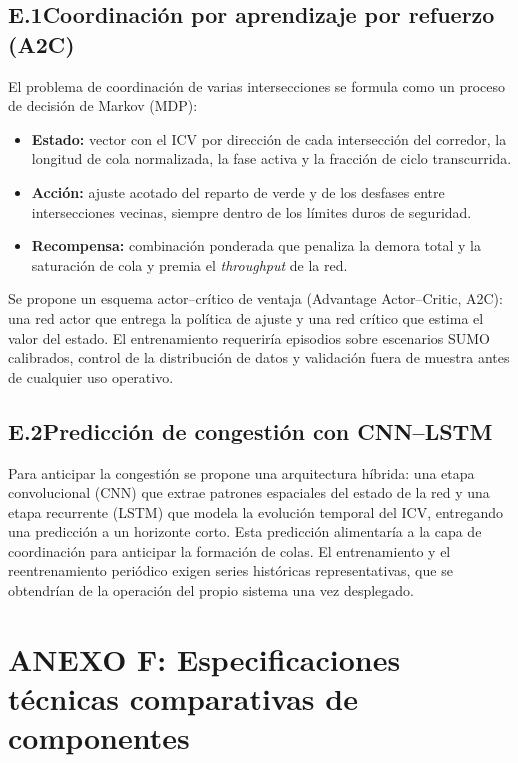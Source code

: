 \subsection*{E.1\quad Coordinación por aprendizaje por refuerzo (A2C)}
El problema de coordinación de varias intersecciones se formula como un proceso de decisión de Markov (MDP):
\begin{itemize}
\item \textbf{Estado:} vector con el ICV por dirección de cada intersección del corredor, la longitud de
cola normalizada, la fase activa y la fracción de ciclo transcurrida.
\item \textbf{Acción:} ajuste acotado del reparto de verde y de los desfases entre intersecciones vecinas,
siempre dentro de los límites duros de seguridad.
\item \textbf{Recompensa:} combinación ponderada que penaliza la demora total y la saturación de cola y
premia el \textit{throughput} de la red.
\end{itemize}
Se propone un esquema actor--crítico de ventaja (Advantage Actor--Critic, A2C): una red actor que entrega la
política de ajuste y una red crítico que estima el valor del estado. El entrenamiento requeriría episodios
sobre escenarios SUMO calibrados, control de la distribución de datos y validación fuera de muestra antes de
cualquier uso operativo.

\subsection*{E.2\quad Predicción de congestión con CNN--LSTM}
Para anticipar la congestión se propone una arquitectura híbrida: una etapa convolucional (CNN) que extrae
patrones espaciales del estado de la red y una etapa recurrente (LSTM) que modela la evolución temporal del
ICV, entregando una predicción a un horizonte corto. Esta predicción alimentaría a la capa de coordinación
para anticipar la formación de colas. El entrenamiento y el reentrenamiento periódico exigen series
históricas representativas, que se obtendrían de la operación del propio sistema una vez desplegado.

\section*{ANEXO F: Especificaciones técnicas comparativas de componentes}
\label{anexo:componentes}

